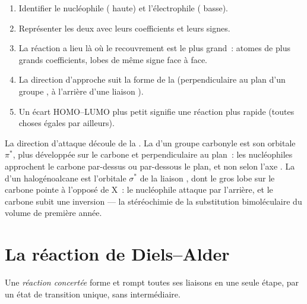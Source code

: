 \begin{method}\label{met:b2:frontier-orbitals:fmo}
\begin{enumerate}
  \item Identifier le nucléophile ( haute) et l'électrophile ( basse).
  \item Représenter les deux  avec leurs coefficients et leurs signes.
  \item La réaction a lieu là où le recouvrement est le plus grand~: atomes de plus grands
        coefficients, lobes de même signe face à face.
  \item La direction d'approche suit la forme de la  (perpendiculaire au plan d'un
        groupe , à l'arrière d'une liaison ).
  \item Un écart HOMO--LUMO plus petit signifie une réaction plus rapide (toutes choses égales par ailleurs).
\end{enumerate}
\end{method}

La direction d'attaque découle de la . La  d'un groupe carbonyle est son orbitale
$\pi^*$, plus développée sur le carbone et perpendiculaire au plan~: les nucléophiles approchent
le carbone par-dessus ou par-dessous le plan, et non selon l'axe . La  d'un
halogénoalcane est l'orbitale $\sigma^*$ de la liaison , dont le gros lobe sur le carbone
pointe à l'opposé de X~: le nucléophile attaque par l'arrière, et le carbone subit une inversion
--- la stéréochimie de la substitution bimoléculaire du volume de première année.

\section{La réaction de Diels--Alder}

\begin{definition}\label{def:b2:frontier-orbitals:concerted}
Une \emph{réaction concertée} forme et rompt toutes ses liaisons en
une seule étape, par un état de transition unique, sans intermédiaire.
\end{definition}

